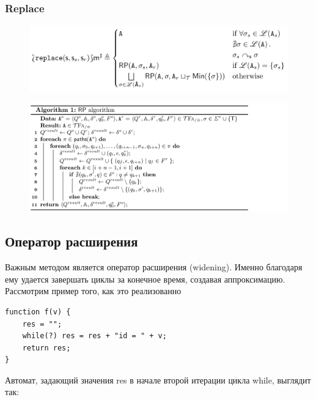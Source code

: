 \newpage
\subsubsection*{Replace}
\begin{figure}[H]
\includegraphics[width=\textwidth]{images/tarsis-replace.png}\hfill
\end{figure}

\begin{figure}[H]
\includegraphics[width=\textwidth]{images/tarsis-RP-algo.png}\hfill
\end{figure}




\newpage
\subsection{Оператор расширения}
Важным методом является оператор расширения (widening). Именно благодаря ему удается завершать циклы за конечное время, создавая аппроксимацию. Рассмотрим пример того, как это реализованно

\begin{lstlisting}[caption={Пример применения widening}]
function f(v) {
    res = "";
    while(?) res = res + "id = " + v;
    return res;
}
\end{lstlisting}

Автомат, задающий значения res в начале второй итерации цикла while, выглядит так:
\begin{figure}[h]
    \centering
\end{figure}

